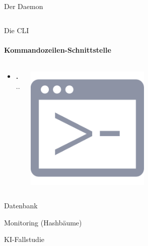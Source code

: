 \documentclass[
    ngerman,%
    authorontitle=true,
]{bfhbeamer}
\begin{document}
\begin{frame}{Der Daemon}
\begin{columns}
\begin{column}{0.3\textwidth}
\begin{center}
                \end{center}
            \end{column}
        \end{columns}

    \end{frame}

    \begin{frame}{Die CLI}
        \framesubtitle{Kommandozeilen-Schnittstelle}
        \begin{columns}
            \begin{column}{0.7\textwidth}
                \begin{itemize}
                    \item \textbf ...
                \end{itemize}
            \end{column}
            \begin{column}{0.3\textwidth}
                \begin{center}
                    \includegraphics[width=0.5\textwidth]{assets/presentation/prompt}
                \end{center}
            \end{column}
        \end{columns}
    \end{frame}

    \begin{frame}{Datenbank}
    \end{frame}

    \begin{frame}{Monitoring (Hashbäume)}
    \end{frame}

    \begin{frame}{KI-Fallstudie}
    \end{frame}
\end{document}

